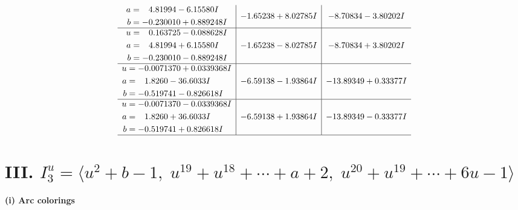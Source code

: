 \documentclass[1p]{elsarticle_modified}
\theoremstyle{definition}
\begin{document}
$$\begin{array}{c|c|c}
\begin{aligned}
a &= \phantom{-}4.81994 - 6.15580 I \\
b &= -0.230010 + 0.889248 I\end{aligned}
 & -1.65238 + 8.02785 I & -8.70834 - 3.80202 I \\ \hline\begin{aligned}
u &= \phantom{-}0.163725 - 0.088628 I \\
a &= \phantom{-}4.81994 + 6.15580 I \\
b &= -0.230010 - 0.889248 I\end{aligned}
 & -1.65238 - 8.02785 I & -8.70834 + 3.80202 I \\ \hline\begin{aligned}
u &= -0.0071370 + 0.0339368 I \\
a &= \phantom{-}1.8260 - 36.6033 I \\
b &= -0.519741 - 0.826618 I\end{aligned}
 & -6.59138 - 1.93864 I & -13.89349 + 0.33377 I \\ \hline\begin{aligned}
u &= -0.0071370 - 0.0339368 I \\
a &= \phantom{-}1.8260 + 36.6033 I \\
b &= -0.519741 + 0.826618 I\end{aligned}
 & -6.59138 + 1.93864 I & -13.89349 - 0.33377 I\\
 \hline 
 \end{array}$$\newpage\newpage\renewcommand{\arraystretch}{1}
\centering \section*{III. $I^u_{3}= \langle u^2+b-1,\;u^{19}+u^{18}+\cdots+a+2,\;u^{20}+u^{19}+\cdots+6 u-1 \rangle$}
\flushleft \textbf{(i) Arc colorings}\\
\end{document}
